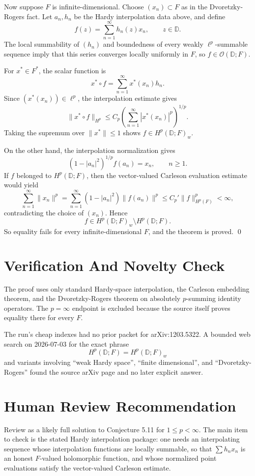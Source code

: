\documentclass[11pt]{article}
\newcommand{\D}{\mathbb D}
\begin{document}
Now suppose \(F\) is infinite-dimensional.  Choose \((x_n)\subset F\) as in
the Dvoretzky-Rogers fact.  Let \(a_n,h_n\) be the Hardy interpolation data
above, and define
\[
  f(z)=\sum_{n=1}^\infty h_n(z)x_n,\qquad z\in\D.
\]
The local summability of \((h_n)\) and boundedness of every weakly
\(\ell^p\)-summable sequence imply that this series converges locally
uniformly in \(F\), so \(f\in\mathcal O(\D;F)\).

For \(x^*\in F^*\), the scalar function is
\[
  x^*\circ f=\sum_{n=1}^\infty x^*(x_n)h_n.
\]
Since \((x^*(x_n))\in\ell^p\), the interpolation estimate gives
\[
  \|x^*\circ f\|_{H^p}
  \le C_p\left(\sum_{n=1}^\infty |x^*(x_n)|^p\right)^{1/p}.
\]
Taking the supremum over \(\|x^*\|\le1\) shows \(f\in H^p(\D;F)_w\).

On the other hand, the interpolation normalization gives
\[
  (1-|a_n|^2)^{1/p}f(a_n)=x_n,\qquad n\ge1.
\]
If \(f\) belonged to \(H^p(\D;F)\), then the vector-valued Carleson evaluation
estimate would yield
\[
  \sum_{n=1}^\infty \|x_n\|^p
  =\sum_{n=1}^\infty(1-|a_n|^2)\|f(a_n)\|^p
  \le C_p'\|f\|_{H^p(F)}^p<\infty,
\]
contradicting the choice of \((x_n)\).  Hence
\[
  f\in H^p(\D;F)_w\setminus H^p(\D;F).
\]
So equality fails for every infinite-dimensional \(F\), and the theorem is
proved.
\qed

\section*{Verification And Novelty Check}

The proof uses only standard Hardy-space interpolation, the Carleson embedding
theorem, and the Dvoretzky-Rogers theorem on absolutely \(p\)-summing identity
operators.  The \(p=\infty\) endpoint is excluded because the source itself
proves equality there for every \(F\).

The run's cheap indexes had no prior packet for arXiv:1203.5322.  A bounded
web search on 2026-07-03 for the exact phrase
\[
  H^p(\mathbb D;F)=H^p(\mathbb D;F)_w
\]
and variants involving ``weak Hardy space'', ``finite dimensional'', and
``Dvoretzky-Rogers'' found the source arXiv page and no later explicit answer.

\section*{Human Review Recommendation}

Review as a likely full solution to Conjecture 5.11 for \(1\le p<\infty\).
The main item to check is the stated Hardy interpolation package: one needs an
interpolating sequence whose interpolation functions are locally summable, so
that \(\sum h_nx_n\) is an honest \(F\)-valued holomorphic function, and whose
normalized point evaluations satisfy the vector-valued Carleson estimate.
\end{document}
